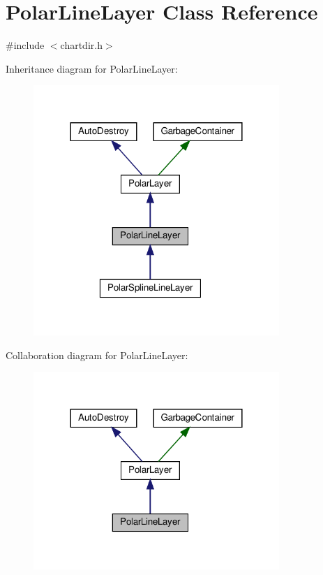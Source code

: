 \hypertarget{class_polar_line_layer}{}\section{Polar\+Line\+Layer Class Reference}
\label{class_polar_line_layer}


{\ttfamily \#include $<$chartdir.\+h$>$}



Inheritance diagram for Polar\+Line\+Layer\+:
\nopagebreak
\begin{figure}[H]
\begin{center}
\leavevmode
\includegraphics[width=264pt]{class_polar_line_layer__inherit__graph}
\end{center}
\end{figure}


Collaboration diagram for Polar\+Line\+Layer\+:
\nopagebreak
\begin{figure}[H]
\begin{center}
\leavevmode
\includegraphics[width=264pt]{class_polar_line_layer__coll__graph}
\end{center}
\end{figure}
